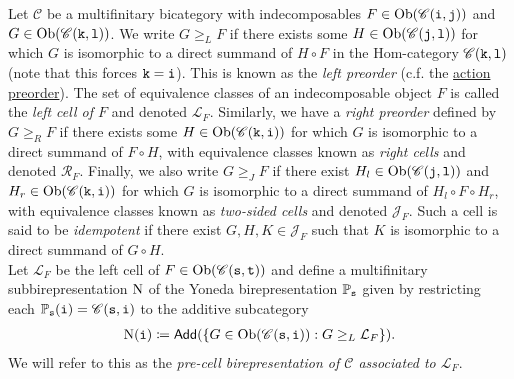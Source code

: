 \noindent Let $\mathscr{C}$ be a multifinitary bicategory with indecomposables $F \in \textup{Ob}(\mathscr{C}(\textup{\texttt{i}}, \textup{\texttt{j}}))$ and $G \in \textup{Ob}(\mathscr{C}(\textup{\texttt{k}}, \textup{\texttt{l}}))$. We write $G \geq_L F$ if there exists some $H \in \textup{Ob}(\mathscr{C}(\textup{\texttt{j}}, \textup{\texttt{l}}))$ for which $G$ is isomorphic to a direct summand of $H \circ F$ in the Hom-category $\mathscr{C}(\textup{\texttt{k}}, \textup{\texttt{l}})$ (note that this forces $\textup{\texttt{k}} = \textup{\texttt{i}}$). This is known as the {\em left preorder} (c.f. the \hyperref[ActionPreorder]{action preorder}). The set of equivalence classes of an indecomposable object $F$ is called the {\em left cell of $F$} and denoted $\mathcal{L}_F$. Similarly, we have a {\em right preorder} defined by $G \geq_R F$ if there exists some $H \in \textup{Ob}(\mathscr{C}(\textup{\texttt{k}}, \textup{\texttt{i}}))$ for which $G$ is isomorphic to a direct summand of $F \circ H$, with equivalence classes known as {\em right cells} and denoted $\mathcal{R}_F$. Finally, we also write $G \geq_{J} F$ if there exist $H_l \in \textup{Ob}(\mathscr{C}(\textup{\texttt{j}}, \textup{\texttt{l}}))$ and $H_r \in \textup{Ob}(\mathscr{C}(\textup{\texttt{k}}, \textup{\texttt{i}}))$ for which $G$ is isomorphic to a direct summand of $H_l \circ F \circ H_r$, with equivalence classes known as {\em two-sided cells} and denoted $\mathcal{J}_F$. Such a cell is said to be {\em idempotent} if there exist $G, H, K \in \mathcal{J}_F$ such that $K$ is isomorphic to a direct summand of $G \circ H$.\\


\noindent Let $\mathcal{L}_F$ be the left cell of $F \in \textup{Ob}(\mathscr{C}(\textup{\texttt{s}}, \textup{\texttt{t}}))$ and define a multifinitary subbirepresentation $\textup{N}$ of the Yoneda birepresentation $\mathbb{P}_{\textup{\texttt{s}}}$ given by restricting each $\mathbb{P}_{\textup{\texttt{s}}}(\textup{\texttt{i}}) = \mathscr{C}(\textup{\texttt{s}}, \textup{\texttt{i}})$ to the additive subcategory
\begin{align*}
\begin{split}
\textup{N}(\textup{\texttt{i}}) \coloneqq \textup{\textsf{Add}}(\{G \in \textup{Ob}(\mathscr{C}(\textup{\texttt{s}}, \textup{\texttt{i}})) : G \geq_L \mathcal{L}_F\}).
\end{split}
\end{align*}
\noindent We will refer to this as the \textit{pre-cell birepresentation of $\mathscr{C}$ associated to $\mathcal{L}_F$}.\\

